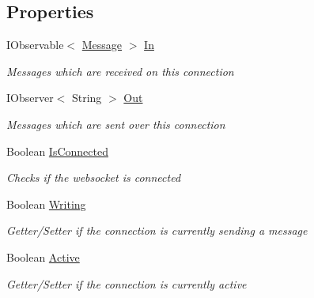 \subsection*{Properties}
\begin{DoxyCompactItemize}
\item 
I\+Observable$<$ \hyperlink{class_web_analyzer_1_1_models_1_1_message_model_1_1_message}{Message} $>$ \hyperlink{class_web_analyzer_1_1_server_1_1_websocket_connection_aaff532a55d94eaddd75a2619da307c6a}{In}
\begin{DoxyCompactList}\small\item\em Messages which are received on this connection \end{DoxyCompactList}\item 
I\+Observer$<$ String $>$ \hyperlink{class_web_analyzer_1_1_server_1_1_websocket_connection_a1f0be7b1ff80c5b742204d0883157578}{Out}
\begin{DoxyCompactList}\small\item\em Messages which are sent over this connection \end{DoxyCompactList}\item 
Boolean \hyperlink{class_web_analyzer_1_1_server_1_1_websocket_connection_a54d71b7e50589c027fff5441dea6ca54}{Is\+Connected}
\begin{DoxyCompactList}\small\item\em Checks if the websocket is connected \end{DoxyCompactList}\item 
Boolean \hyperlink{class_web_analyzer_1_1_server_1_1_websocket_connection_a973edb4f0e5e1644f551bf132ae77183}{Writing}
\begin{DoxyCompactList}\small\item\em Getter/\+Setter if the connection is currently sending a message \end{DoxyCompactList}\item 
Boolean \hyperlink{class_web_analyzer_1_1_server_1_1_websocket_connection_af64b83d9aec7d436a262f732e3b03e0b}{Active}
\begin{DoxyCompactList}\small\item\em Getter/\+Setter if the connection is currently active \end{DoxyCompactList}\item 

\end{DoxyCompactItemize}
